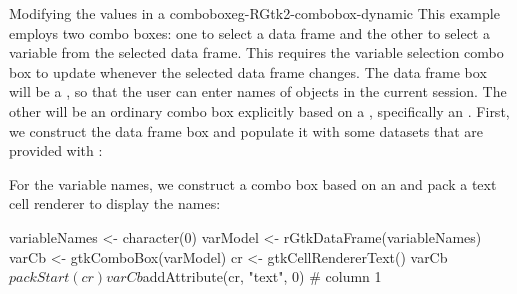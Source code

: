 \begin{example}{Modifying the values in a combobox}{eg-RGtk2-combobox-dynamic}
This example employs two combo boxes: one to select a data frame and
the other to select a variable from the selected data frame. This
requires the variable selection combo box to update whenever the
selected data frame changes.  The data frame box will be a
, so that the user can enter names of objects
in the current session. The other will be an ordinary combo box
explicitly based on a , specifically an
. First, we construct the data frame box
and populate it with some datasets that are provided with \R:
\begin{Schunk}
\end{Schunk}

For the variable names, we construct a combo box based on an
 and pack a text cell renderer to display the
names:
\begin{Schunk}
\begin{Sinput}
 variableNames <- character(0)
 varModel <- rGtkDataFrame(variableNames)
 varCb <- gtkComboBox(varModel)
 cr <- gtkCellRendererText()
 varCb$packStart(cr)
 varCb$addAttribute(cr, "text", 0)       # column 1
\end{Sinput}
\end{Schunk}



\end{example}
